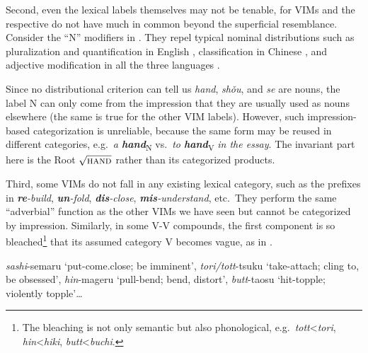 \documentclass[output=paper]{langsci/langscibook}
\begin{document}
Second, even the lexical labels themselves may not be tenable, for \glspl{VIM}
and the respective  do not have much in common beyond the
superficial resemblance. Consider the ``N'' modifiers in . They
repel typical nominal distributions such as pluralization and quantification in
English , classification in Chinese , and adjective
modification in all the three languages .

\ea\label{ex:n}
\label{ex:n-eng}
\label{ex:n-chi}
\label{ex:n-all}
\z
\z

\noindent Since no distributional criterion can tell us \textit{hand},
\textit{sh\v{o}u}, and \textit{se} are nouns, the label N can only come from
the impression that they are usually used as nouns elsewhere (the same is true
for the other \gls{VIM} labels). However, such impression-based categorization
is unreliable, because the same form may be reused in different categories,
e.g.\ \textit{a \textbf{hand}}\textsubscript{N} vs.\ \textit{to
\textbf{hand}}\textsubscript{V} \textit{in the essay}. The invariant part here
is the Root $\sqrt{\textrm{\textsc{hand}}}$ rather than its categorized
products.


Third, some \glspl{VIM} do not fall in any existing lexical category, such as the prefixes in \textit{\textbf{re}-build},
\textit{\textbf{un}-fold}, \textit{\textbf{dis}-close},
\textit{\textbf{mis}-understand}, etc.\ They perform the same ``adverbial''
function as the other \glspl{VIM} we have seen but cannot be categorized by
impression. Similarly, in some  V-V compounds, the first
component is so bleached\footnote{The bleaching is not only semantic but also
phonological, e.g.\ \textit{tott}<\textit{tori}, \textit{hin}<\textit{hiki},
\textit{butt}<\textit{buchi}.} that its assumed category V becomes vague, as in
.

\ea\label{ex:jap-pre}
\textit{sashi}-semaru {`put-come.close; be imminent'}, \textit{tori/tott}-tsuku {`take-attach; cling to, be obsessed'}, \textit{hin}-mageru {`pull-bend; bend, distort'}, \textit{butt}-taosu {`hit-topple; violently topple'}\dots
\z
\end{document}
